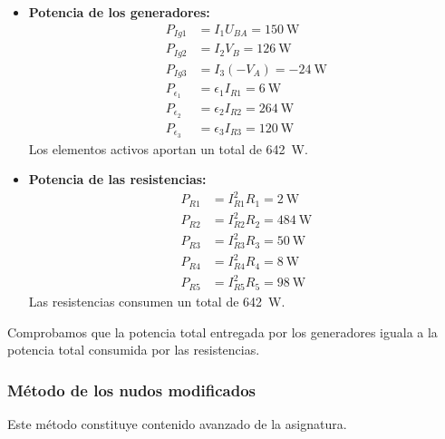\begin{example}
\begin{itemize}
\item \textbf{Potencia de los generadores:}
  \begin{align*}
    P_{Ig1} &= I_1 U_{BA} = \qty{150}{\watt}\\
    P_{Ig2} &= I_2 V_{B} = \qty{126}{\watt}\\
    P_{Ig3} &= I_3 (-V_{A}) = - \qty{24}{\watt}\\
    P_{\epsilon_1} &= \epsilon_1 I_{R1} = \qty{6}{\watt}\\
    P_{\epsilon_2} &= \epsilon_2 I_{R2} = \qty{264}{\watt}\\
    P_{\epsilon_3} &= \epsilon_3 I_{R3} = \qty{120}{\watt}
  \end{align*}
  Los elementos activos aportan un total de \qty{642}{\watt}.
\item \textbf{Potencia de las resistencias:}
  \begin{align*}
    P_{R1} &= I^2_{R1} R_1 = \qty{2}{\watt}\\
    P_{R2} &= I^2_{R2} R_2 = \qty{484}{\watt}\\
    P_{R3} &= I^2_{R3} R_3 = \qty{50}{\watt}\\
    P_{R4} &= I^2_{R4} R_4 = \qty{8}{\watt}\\
    P_{R5} &= I^2_{R5} R_5 = \qty{98}{\watt}
  \end{align*}
  Las resistencias consumen un total de \SI{642}{\watt}.
\end{itemize}

Comprobamos que la potencia total entregada por los generadores iguala
a la potencia total consumida por las resistencias.

\end{example}
	
\subsubsection{Método de los nudos
  modificados}\label{sec.nudos_modificados}
	
	\begin{remark}
          Este método constituye contenido avanzado de la asignatura.
	\end{remark}
	
